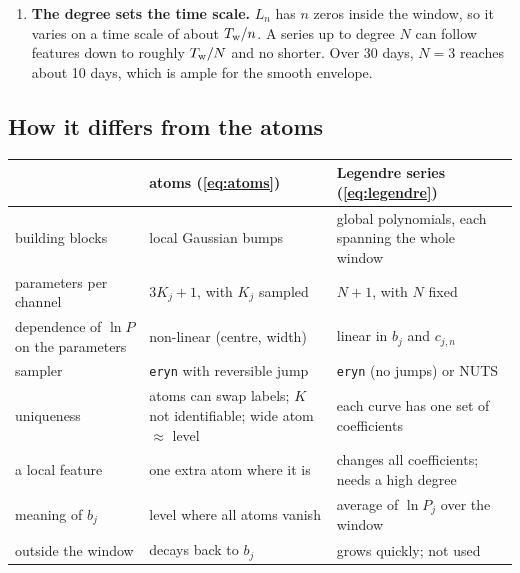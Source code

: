\documentclass[11pt,a4paper]{article}
\begin{document}
\begin{enumerate}
        The orthogonality holds for an even weighting of time; the likelihood weights
        the blocks by how much they constrain $P_j$, so in the posterior the
        coefficients are not exactly uncorrelated, but much less correlated than
        powers would be.
  \item \textbf{The degree sets the time scale.} $L_n$ has $n$ zeros inside the
        window, so it varies on a time scale of about $T_{\rm w}/n$. A series up to
        degree $N$ can follow features down to roughly $T_{\rm w}/N$ and no shorter. Over
        30 days, $N=3$ reaches about 10 days, which is ample for the smooth envelope.
\end{enumerate}

\subsection{How it differs from the atoms}

\begin{center}
\renewcommand{\arraystretch}{1.2}
\footnotesize
\begin{tabular}{@{}p{3.6cm}p{5.4cm}p{5.4cm}@{}}
\toprule
 & atoms (\cref{eq:atoms}) & Legendre series (\cref{eq:legendre}) \\
\midrule
building blocks & local Gaussian bumps & global polynomials, each spanning the whole window \\
parameters per channel & $3K_j+1$, with $K_j$ sampled & $N+1$, with $N$ fixed \\
dependence of $\ln P$ on the parameters & non-linear (centre, width) & linear in $b_j$ and $c_{j,n}$ \\
sampler & \texttt{eryn} with reversible jump & \texttt{eryn} (no jumps) or NUTS \\
uniqueness & atoms can swap labels; $K$ not identifiable; wide atom $\approx$ level & each curve has one set of coefficients \\
a local feature & one extra atom where it is & changes all coefficients; needs a high degree \\
meaning of $b_j$ & level where all atoms vanish & average of $\ln P_j$ over the window \\
outside the window & decays back to $b_j$ & grows quickly; not used \\
\bottomrule
\end{tabular}
\end{center}
\end{document}

